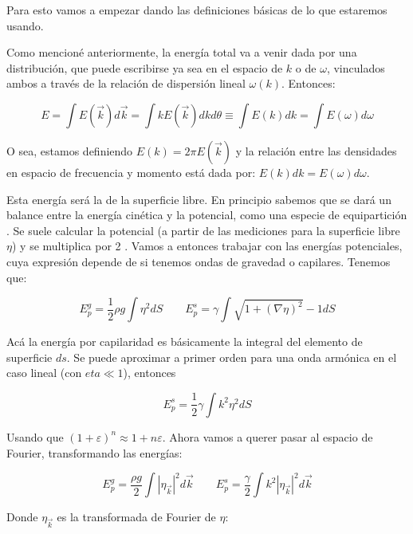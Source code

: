 Para esto vamos a empezar dando las definiciones básicas de lo que estaremos usando.

Como mencioné anteriormente, la energía total va a venir dada por una distribución, que puede escribirse ya sea en el espacio de $k$ o de $\omega$, vinculados ambos a través de la relación de dispersión lineal $\omega(k)$. Entonces:

\begin{equation}
	E = \int E(\vec k) d\vec k = \int k E(\vec k) dkd\theta \equiv \int E(k) dk = \int E(\omega) d\omega
\end{equation}

O sea, estamos definiendo $E(k) = 2\pi E(\vec k)$ y la relación entre las densidades en espacio de frecuencia y momento está dada por: $E(k) dk = E(\omega) d\omega$.

Esta energía será la de la superficie libre. En principio sabemos que se dará un balance entre la energía cinética y la potencial, como una especie de equipartición \cite{kunduFluidMechanics2014}. Se suele calcular la potencial (a partir de las mediciones para la superficie libre $\eta$) y se multiplica por 2 \cite{deikeEtudesExperimentalesNumeriques2013}. Vamos a entonces trabajar con las energías potenciales, cuya expresión depende de si tenemos ondas de gravedad o capilares. Tenemos que:

\begin{equation}
	E_p^g = \frac{1}{2} \rho g \int \eta^2 dS \qquad E_p^s = \gamma \int\sqrt{1+(\nabla\eta)^2} - 1 dS
\end{equation}

Acá la energía por capilaridad es básicamente la integral del elemento de superficie $ds$. Se puede aproximar a primer orden para una onda armónica en el caso lineal (con $eta\ll1$), entonces \cite{deikeEtudesExperimentalesNumeriques2013}

\begin{equation}
	E_p^s = \frac{1}{2} \gamma\int k^2\eta^2dS
\end{equation}

Usando que $(1+\varepsilon)^n\approx1+n\varepsilon$. Ahora vamos a querer pasar al espacio de Fourier, transformando las energías:

\begin{equation}
	E_p^g = \frac{\rho g}{2} \int |\eta_{\vec k}|^2d\vec k \qquad E_p^s = \frac{\gamma}{2} \int k^2|\eta_{\vec k}|^2d\vec k
\end{equation}

Donde $\eta_{\vec k}$ es la transformada de Fourier de $\eta$:


